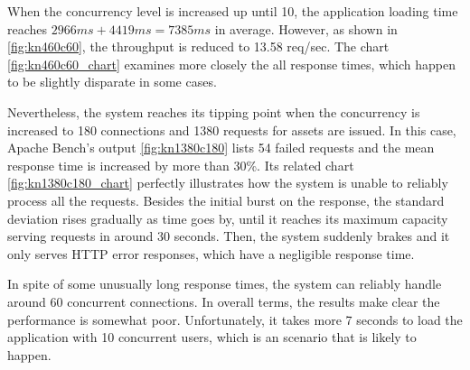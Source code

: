When the concurrency level is increased up until 10, the application loading time reaches $2966ms + 4419ms = 7385ms$ in average. However, as shown in \ref{fig:kn460c60}, the throughput is reduced to 13.58 req/sec. The chart \ref{fig:kn460c60_chart} examines more closely the all response times, which happen to be slightly disparate in some cases.

Nevertheless, the system reaches its tipping point when the concurrency is increased to 180 connections and 1380 requests for assets are issued. In this case, Apache Bench's output \ref{fig:kn1380c180} lists 54 failed requests and the mean response time is increased by more than 30\%. Its related chart \ref{fig:kn1380c180_chart} perfectly illustrates how the system is unable to reliably process all the requests. Besides the initial burst on the response, the standard deviation rises gradually as time goes by, until it reaches its maximum capacity serving requests in around 30 seconds. Then, the system suddenly brakes and it only serves HTTP error responses, which have a negligible response time.

In spite of some unusually long response times, the system can reliably handle around 60 concurrent connections. In overall terms, the results make clear the performance is somewhat poor. Unfortunately, it takes more 7 seconds to load the application with 10 concurrent users, which is an scenario that is likely to happen.


